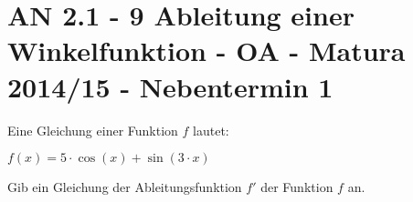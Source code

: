 \section{AN 2.1 - 9 Ableitung einer Winkelfunktion - OA - Matura 2014/15 - Nebentermin 1}

\begin{beispiel}[AN 2.1]{1} %
Eine Gleichung einer Funktion $f$ lautet:

$f(x)=5\cdot \cos(x)+\sin(3\cdot x)$ \leer

Gib ein Gleichung der Ableitungsfunktion $f'$ der Funktion $f$ an.

\end{beispiel}